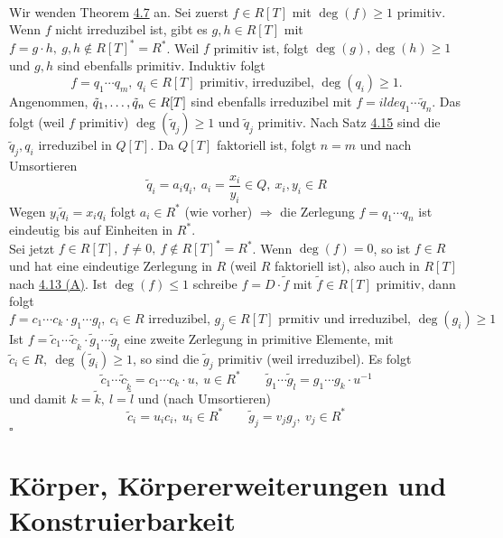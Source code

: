 \\
Wir wenden Theorem \hyperref[sub:satz_16]{4.7} an.
Sei zuerst $f\in R[T]$ mit $\deg(f)\ge 1$ primitiv.
Wenn $f$ nicht irreduzibel ist, gibt es $g,h\in R[T]$ mit $f=g\cdot h,~g,h\notin R[T]^*=R^*$.
Weil $f$ primitiv ist, folgt $\deg(g),\deg(h)\ge 1$ und $g,h$ sind ebenfalls primitiv.
Induktiv folgt
\[
f=q_1\cdots q_m,~q_i\in R[T] \text{ primitiv, irreduzibel, }\deg(q_i)\ge 1.
\]
Angenommen, $\tilde{q}_1, \dots ,\tilde{q}_n\in R[T]$ sind ebenfalls irreduzibel mit $f=ilde{q}_1\cdots\tilde{q}_n$.
Das folgt (weil $f$ primitiv) $\deg(\tilde{q}_j)\ge 1$ und $\tilde{q}_j$ primitiv.
Nach Satz \hyperref[sub:satz_18]{4.15} sind die $\tilde{q}_j,q_i$ irreduzibel in $Q[T]$.
Da $Q[T]$ faktoriell ist, folgt $n=m$ und nach Umsortieren
\[
\tilde{q}_i=a_iq_i,~a_i=\frac{x_i}{y_i}\in Q,~x_i,y_i\in R
\]
Wegen $y_i\tilde{q}_i=x_iq_i$ folgt $a_i\in R^*$ (wie vorher) $\Rightarrow$ die Zerlegung $f=q_1\cdots q_n$ ist eindeutig bis auf Einheiten in $R^*$.\\
Sei jetzt $f\in R[T],~f\neq 0,~f\notin R[T]^*=R^*$.
Wenn $\deg(f)=0$, so ist $f\in R$ und hat eine eindeutige Zerlegung in $R$ (weil $R$ faktoriell ist), also auch in $R[T]$ nach \hyperref[sub:vorbereitung_satz_von_gauss]{4.13 (A)}.
Ist $\deg(f)\le 1$ schreibe $f=D\cdot \tilde{f}$ mit $\tilde{f}\in R[T]$ primitiv, dann folgt
\[
f=c_1\cdots c_k\cdot g_1\cdots g_l,~c_i\in R\text{ irreduzibel, } g_j\in R[T] \text{ prmitiv und irreduzibel, }\deg(g_i)\ge 1
\]
Ist $f=\tilde{c}_1\cdots \tilde{c}_{\tilde{k}}\cdot \tilde{g}_1\cdots\tilde{g}_{\tilde{l}}$ eine zweite Zerlegung in primitive Elemente, mit $\tilde{c}_i\in R,~\deg(\tilde{g}_i)\ge 1$, so sind die $\tilde{g}_j$ primitiv (weil irreduzibel).
Es folgt
\[
\tilde{c}_1\cdots\tilde{c}_{\tilde{k}}=c_1\cdots c_k\cdot u,~u\in R^*\qquad \tilde{g}_1\cdots \tilde{g}_{\tilde{l}}=g_1\cdots g_k\cdot u^{-1}
\]
und damit $k=\tilde{k},~l=\tilde{l}$ und (nach Umsortieren)
\[
\tilde{c}_i=u_ic_i,~u_i\in R^*\qquad\tilde{g}_j=v_jg_j,~v_j\in R^*
\]
\hfill $\square$

\newpage
\section{Körper, Körpererweiterungen und Konstruierbarkeit}
\label{sec:k,k,k}
